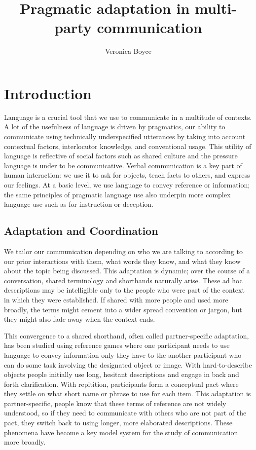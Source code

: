 \documentclass[11pt]{article}
\title{Pragmatic adaptation in multi-party communication}
\author{Veronica Boyce}
\begin{document}
	\maketitle

	\section{Introduction}
	Language is a crucial tool that we use to communicate in a multitude of contexts. A lot of the usefulness of language is driven by pragmatics, our ability to communicate using technically underspecified utterances by taking into account contextual factors, interlocutor knowledge, and conventional usage.  This utility of language is reflective of social factors such as shared culture and the pressure language is under to be communicative.  Verbal communication is a key part of human interaction: we use it to ask for objects, teach facts to others, and express our feelings. At a basic level, we use language to convey reference or information; the same principles of pragmatic language use also underpin more complex language use such as for instruction or deception.  
	\subsection{Adaptation and Coordination}
	 We tailor our communication depending on who we are talking to according to our prior interactions with them, what words they know, and what they know about the topic being discussed. This adaptation is dynamic; over the course of a conversation, shared terminology and shorthands naturally arise. These ad hoc descriptions may be intelligible only to the people who were part of the context in which they were established. If shared with more people and used more broadly, the terms might cement into a wider spread convention or jargon, but they might also fade away when the context ends. 
	
	 This convergence to a shared shorthand, often called partner-specific adaptation, has been studied using reference games where one participant needs to use language to convey information only they have to the another participant who can do some task involving the designated object or image. With hard-to-describe objects people initially use long, hesitant descriptions and engage in back and forth clarification. With repitition, participants form a conceptual pact where they settle on what short name or phrase to use for each item. This adaptation is partner-specific, people know that these terms of reference are not widely understood, so if they need to communicate with others who are not part of the pact, they switch back to using longer, more elaborated descriptions. These phenomena have become a key model system for the study of communication more broadly.
	
\end{document}
